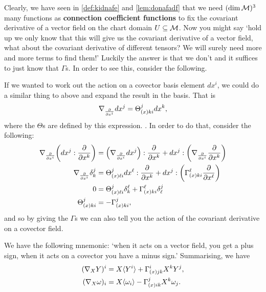 \documentclass[12pt]{article} %
\begin{document}
Clearly, we have seen in \cref{def:kidnafe} and \cref{lem:donafadf} that  we need  $(\dim \mathcal{M})^3$ many functions as \textbf{connection coefficient functions} to fix the covariant derivative of a vector field on the chart domain $U\subseteq\mathcal{M}$. 
Now you might say `hold up we only know that this will give us the covariant derivative of a vector field, what about the covariant derivative of different tensors? We will surely need more and more terms to find them!' Luckily the answer is that we don't and it suffices to just know that $\Gamma$s. In order to see this, consider the following. 

If we wanted to work out the action on a covector basis element $dx^i$, we could do a similar thing to above and expand the result in the basis. That is
\begin{align*} 
    \nabla_{\frac{\partial}{\partial x^i}} dx^j = \Theta^j_{(x)ki} dx^k,
\end{align*} 
where the $\Theta$s are defined by this expression. . In order to do that, consider the following:
\begin{align*} 
    \begin{split}
        \nabla_{\frac{\partial}{\partial x^i}} \bigg( dx^j : \frac{\partial}{\partial x^k}\bigg) & = \Big(\nabla_{\frac{\partial}{\partial x^i}} dx^j\Big):\frac{\partial}{\partial x^k} + dx^j :\bigg(\nabla_{\frac{\partial}{\partial x^i}}\frac{\partial}{\partial x^k}\bigg) \\
       \nabla_{\frac{\partial}{\partial x^i}}\delta^j_k & = \Theta^{j}_{(x)\ell i}dx^{\ell}:\frac{\partial}{\partial x^k} + dx^j : \bigg( \Gamma^{\ell}_{(x)ki} \frac{\partial}{\partial x^{\ell}}\bigg) \\
       0 & = \Theta^j_{(x)\ell i} \delta^{\ell}_k + \Gamma^{\ell}_{(x)ki} \delta^j_{\ell} \\
       \Theta^j_{(x)ki} & = - \Gamma^j_{(x)ki},
    \end{split}
\end{align*}
and so by giving the $\Gamma$s we can also tell you the action of the covariant derivative on a covector field.

We have the following mnemonic: `when it acts on a vector field, you get a plus sign, when it acts on a covector you have a minus sign.' Summarising, we have 
\begin{align*} 
    \begin{split}
        (\nabla_X Y)^i & = X\langle Y^i\rangle + \Gamma^i_{(x)jk} X^k Y^j, \\
        (\nabla_X \omega)_i & = X\langle \omega_i \rangle - \Gamma^j_{(x)ik} X^k \omega_j.
    \end{split}
\end{align*}
\end{document}
